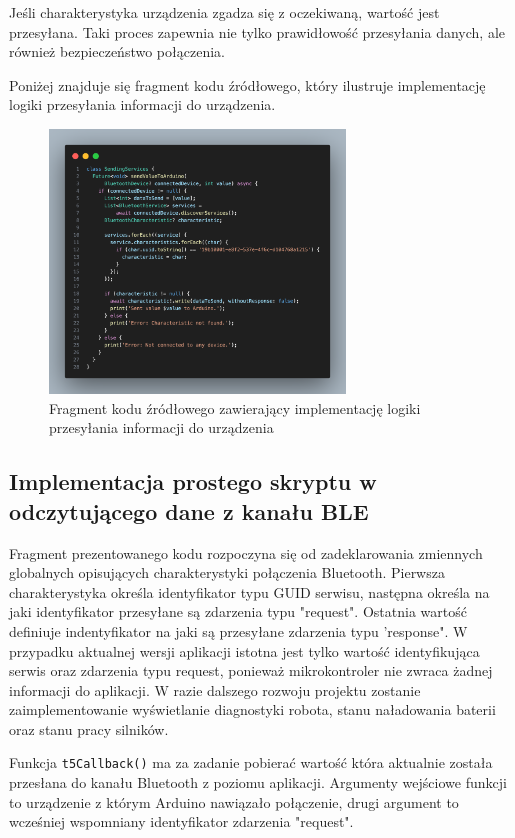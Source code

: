 \documentclass{report}
\begin{document}
Jeśli charakterystyka urządzenia zgadza się z oczekiwaną, wartość jest przesyłana. Taki proces zapewnia nie tylko prawidłowość przesyłania danych, ale również bezpieczeństwo połączenia.

Poniżej znajduje się fragment kodu źródłowego, który ilustruje implementację logiki przesyłania informacji do urządzenia.

\begin{figure}[H]
\centering
\includegraphics[width=0.7\textwidth]{src/app/send.png}
\caption{Fragment kodu źródłowego zawierający implementację logiki przesyłania informacji do urządzenia}
\label{fig:send-val}
\end{figure}


\subsection{\Large Implementacja prostego skryptu w odczytującego dane z kanału BLE }
Fragment prezentowanego kodu rozpoczyna się od zadeklarowania zmiennych globalnych opisujących charakterystyki połączenia Bluetooth. Pierwsza charakterystyka określa identyfikator typu GUID serwisu, następna określa na jaki identyfikator przesyłane są zdarzenia typu "request". Ostatnia wartość definiuje indentyfikator na jaki są przesyłane zdarzenia typu 'response". 
W przypadku aktualnej wersji aplikacji istotna jest tylko wartość identyfikująca serwis oraz zdarzenia typu request, ponieważ mikrokontroler nie zwraca żadnej informacji do aplikacji. W razie dalszego rozwoju projektu zostanie zaimplementowanie wyświetlanie diagnostyki robota, stanu naładowania baterii oraz stanu pracy silników. 

Funkcja \texttt{t5Callback()} ma za zadanie pobierać wartość która aktualnie została przesłana do kanału Bluetooth z poziomu aplikacji. Argumenty wejściowe funkcji to urządzenie z którym Arduino nawiązało połączenie, drugi argument to wcześniej wspomniany identyfikator zdarzenia "request".
\end{document}
